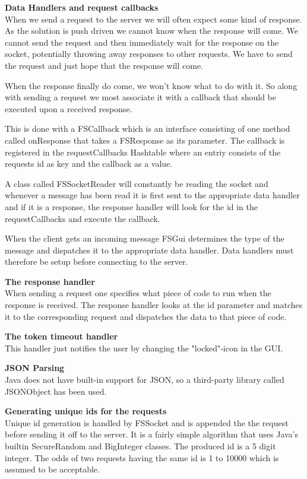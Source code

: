 \textbf{Data Handlers and request callbacks} \\
When we send a request to the server we will often expect some kind of response. As the solution is push driven we cannot know when the response will come. We cannot send the request and then immediately wait for the response on the socket, potentially throwing away responses to other requests. We have to send the request and just hope that the response will come.

When the response finally do come, we won't know what to do with it. So along with sending a request we most associate it with a callback that should be executed upon a received response.

This is done with a FSCallback which is an interface consisting of one method called onResponse that takes a FSResponse as its parameter. The callback is registered in the requestCallbacks Hashtable where an entriy consists of the requests id as key and the callback as a value.

A class called FSSocketReader will constantly be reading the socket and whenever a message has been read it is first sent to the appropriate data handler and if it is a response, the response handler will look for the id in the requestCallbacks and execute the callback.

When the client gets an incoming message FSGui determines the type of the message and dispatches it to the appropriate data handler. Data handlers must therefore be setup before connecting to the server.

\textbf{The response handler} \\
When sending a request one specifies what piece of code to run when the response is received.
The response handler looks at the id parameter and matches it to the corresponding request and dispatches the data to that piece of code.

\textbf{The token timeout handler} \\
This handler just notifies the user by changing the "locked"-icon in the GUI.

\textbf{JSON Parsing} \\
Java does not have built-in support for JSON, so a third-party library called JSONObject has been used.

\textbf{Generating unique ids for the requests} \\
Unique id generation is handled by FSSocket and is appended the the request before sending it off to the server. It is a fairly simple algorithm that uses Java's builtin SecureRandom and BigInteger classes. The produced id is a 5 digit integer. The odds of two requests having the same id is 1 to 10000 which is assumed to be acceptable.

